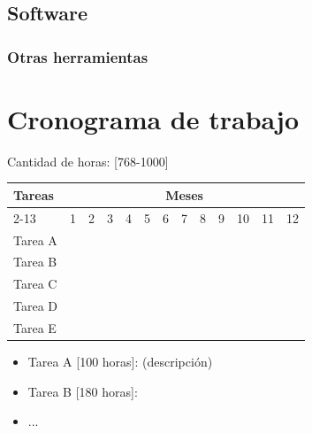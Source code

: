 \documentclass[12pt]{article}
\begin{document}
\subsection{Software}

\subsubsection{Otras herramientas}

\bigskip


\section{Cronograma de trabajo}

Cantidad de horas: [768-1000]

\bigskip

\begin{center}
\def\arraystretch{1.5}
\begin{tabular}{ |l|c|c|c|c|c|c|c|c|c|c|c|c| }

 \hline
 \multirow{2}{1em}{Tareas} & \multicolumn{12}{|c|}{Meses}\\  \cline{2-13} &
     1 & 2 & 3 & 4 & 5 & 6 & 7 & 8 & 9 & 10 & 11 & 12 \\  \hline
 Tarea A & \cellcolor{gray} & \cellcolor{gray} &  &  &  &  &  &  &  &  &  &   \\ 
 \hline
Tarea B &  & \cellcolor{gray} & \cellcolor{gray} &  &  &  &  &  &  &  &  &   \\ 
 \hline
Tarea C &  & \cellcolor{gray} & \cellcolor{gray} & \cellcolor{gray} & \cellcolor{gray} & \cellcolor{gray} & &  &  &  &  &   \\ 
 \hline
Tarea D &  &  &  &  &  &  &  &  &  & &  &   \\ 
 \hline
Tarea E &  &  &  &  &  &  &  & & & \cellcolor{gray} & \cellcolor{gray} & \cellcolor{gray}    \\ 
 \hline
\end{tabular}
\end{center}

\bigskip

\begin{itemize}
    \item Tarea A [100 horas]: (descripción)
    \item Tarea B [180 horas]: 
    \item ...
\end{itemize}

\bigskip




\end{document}
